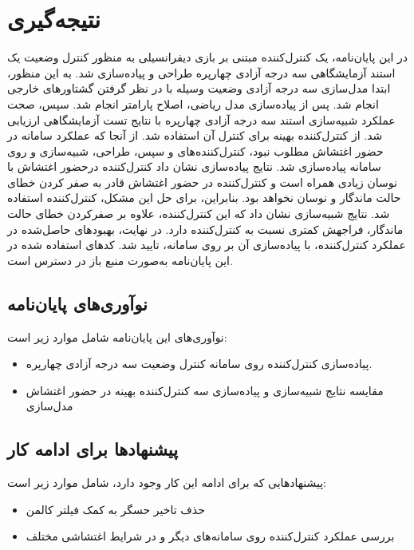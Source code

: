 \chapter{نتیجه‌گیری}
در این پایان‌نامه، یک کنترل‌کننده مبتنی بر بازی دیفرانسیلی به منظور کنترل وضعیت یک استند آزمایشگاهی سه درجه آزادی چهارپره طراحی و پیاده‌سازی شد. 
به این منظور، ابتدا مدل‌سازی سه درجه آزادی وضعیت وسیله با در نظر گرفتن گشتاورهای خارجی انجام شد. پس از پیاده‌سازی مدل ریاضی، اصلاح پارامتر انجام شد. سپس، صحت عملکرد شبیه‌سازی استند سه درجه آزادی چهارپره با نتایج تست آزمایشگاهی ارزیابی شد.
	 از کنترل‌کننده بهینه  برای کنترل آن استفاده شد. از آنجا که عملكرد سامانه در حضور اغتشاش مطلوب نبود، کنترل‌کننده‌های  و سپس،  طراحی، شبیه‌سازی  و روی سامانه پیاده‌سازی شد. نتایج پیاده‌سازی نشان داد کنترل‌کننده  درحضور اغتشاش با نوسان زیادی همراه است و کنترل‌کننده  در حضور اغتشاش قادر به صفر کردن خطای حالت ماندگار و نوسان نخواهد بود. بنابراین، برای حل این مشكل، کنترل‌کننده  استفاده شد. نتایج شبیه‌سازی نشان داد که این کنترل‌کننده، علاوه بر صفرکردن خطای حالت ماندگار، فراجهش کمتری نسبت به کنترل‌کننده  دارد. در نهایت، بهبودهای حاصل‌شده در عملكرد کنترل‌کننده، با پیاده‌سازی آن بر روی سامانه، تایید شد.
	 کدهای استفاده شده در این پایان‌نامه به‌صورت منبع باز 
	 در دسترس است.
\newpage



 \section{نوآوری‌های پایان‌نامه}
 نوآوری‌های این پایان‌نامه شامل موارد زیر است:
 \begin{itemize}
 	\item پیاده‌سازی کنترل‌کننده  روی سامانه کنترل وضعیت سه درجه آزادی چهارپره.
 	\item مقایسه نتایج شبیه‌سازی و پیاده‌سازی سه کنترل‌کننده بهینه در حضور اغتشاش مدل‌سازی
 \end{itemize}

\section{پیشنهادها برای ادامه کار}
پیشنهادهایی که برای ادامه این کار وجود دارد، شامل موارد زیر است:
 \begin{itemize}
	\item حذف تاخیر حسگر به کمک فیلتر کالمن
	\item بررسی عملكرد کنترل‌کننده  روی سامانه‌های دیگر و در شرایط اغتشاشی مختلف
\end{itemize}
